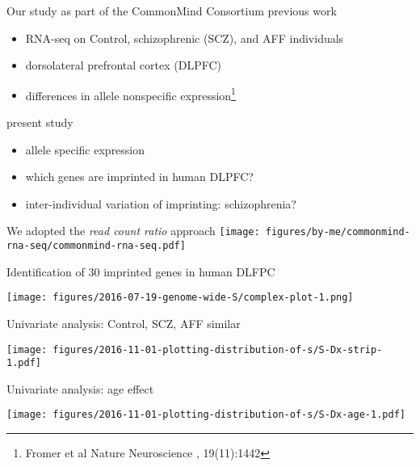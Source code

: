 \documentclass[usenames,dvipsnames]{beamer}
\begin{document}
\begin{frame}{Our study as part of the CommonMind Consortium}
previous work
\begin{itemize}
\item RNA-seq on Control, schizophrenic (SCZ), and AFF individuals
\item dorsolateral prefrontal cortex (DLPFC)
\item differences in allele nonspecific expression\footnote{Fromer et al Nature Neuroscience , 19(11):1442}
\end{itemize}
\vfill

present study
\begin{itemize}
\item allele specific expression
\item which genes are imprinted in human DLPFC?
\item inter-individual variation of imprinting: schizophrenia?
\end{itemize} 
\end{frame}

\begin{frame}[label=cmc]{We adopted the \emph{read count ratio} approach}
\texttt{[image: figures/by-me/commonmind-rna-seq/commonmind-rna-seq.pdf]}
\end{frame}

\begin{frame}{Identification of 30 imprinted genes in human DLFPC}
\begin{center}
\texttt{[image: figures/2016-07-19-genome-wide-S/complex-plot-1.png]}
\end{center}
\end{frame}

\begin{frame}[label=Dx]{Univariate analysis: Control, SCZ, AFF similar}
\begin{center}
\texttt{[image: figures/2016-11-01-plotting-distribution-of-s/S-Dx-strip-1.pdf]}
\end{center}
\end{frame}

\begin{frame}[label=age]{Univariate analysis: age effect}
\begin{center}
\texttt{[image: figures/2016-11-01-plotting-distribution-of-s/S-Dx-age-1.pdf]}
\end{center}
\end{frame}
\end{document}
